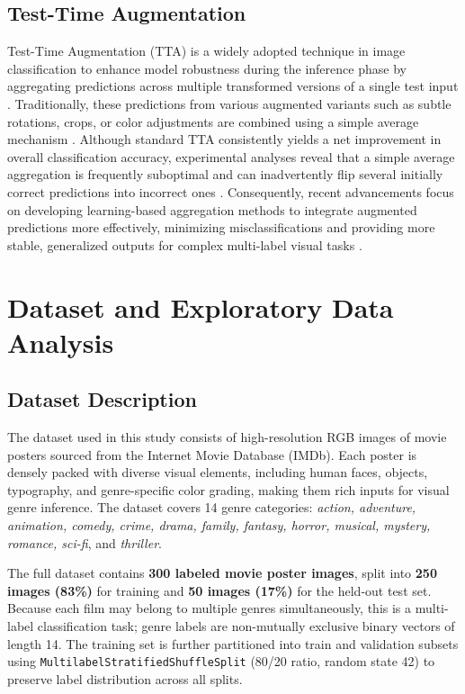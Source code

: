 \documentclass[conference]{IEEEtran}
\begin{document}
\subsection{Test-Time Augmentation}
Test-Time Augmentation (TTA) is a widely adopted technique in image classification to enhance model robustness during the inference phase by aggregating predictions across multiple transformed versions of a single test input \cite{shanmugam2021}. Traditionally, these predictions from various augmented variants such as subtle rotations, crops, or color adjustments are combined using a simple average mechanism \cite{shanmugam2021}. Although standard TTA consistently yields a net improvement in overall classification accuracy, experimental analyses reveal that a simple average aggregation is frequently suboptimal and can inadvertently flip several initially correct predictions into incorrect ones \cite{shanmugam2021}. Consequently, recent advancements focus on developing learning-based aggregation methods to integrate augmented predictions more effectively, minimizing misclassifications and providing more stable, generalized outputs for complex multi-label visual tasks \cite{shanmugam2021}.



\section{Dataset and Exploratory Data Analysis}
\label{sec:dataset}

\subsection{Dataset Description}

The dataset used in this study consists of high-resolution RGB images 
of movie posters sourced from the Internet Movie Database (IMDb). 
Each poster is densely packed with diverse visual elements, including 
human faces, objects, typography, and genre-specific color grading, 
making them rich inputs for visual genre inference. The dataset covers 
14 genre categories: \textit{action, adventure, animation, comedy, 
crime, drama, family, fantasy, horror, musical, mystery, romance, 
sci-fi}, and \textit{thriller}.

The full dataset contains \textbf{300 labeled movie poster images}, 
split into \textbf{250 images (83\%)} for training and \textbf{50 
images (17\%)} for the held-out test set. Because each film may 
belong to multiple genres simultaneously, this is a multi-label 
classification task; genre labels are non-mutually exclusive binary 
vectors of length 14. The training set is further partitioned into 
train and validation subsets using \texttt{MultilabelStratifiedShuffleSplit} 
(80/20 ratio, random state 42) to preserve label distribution across 
all splits.
\end{document}
